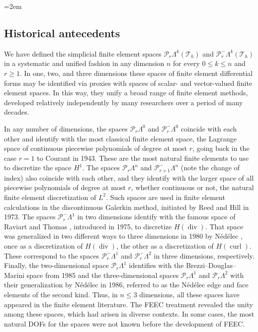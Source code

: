 \endgroup
\begingroup\emergencystretch=2em
\subsection{{Historical antecedents}}\label{sec:historical-antecedents}

{We have defined the simplicial finite element spaces $\mathcal P_r\Lambda^k(\mathcal T_h)$ and $\mathcal P_r^-\Lambda^k(\mathcal T_h)$ in a systematic and unified fashion in any dimension $n$ for every $0\leq k\leq n$ and $r\geq1$. In one, two, and three dimensions these spaces of finite element differential forms may be identified via proxies with spaces of scalar- and vector-valued finite element spaces. In this way, they unify a broad range of finite element methods, developed relatively independently by many researchers over a period of many decades.}

{In any number of dimensions, the spaces $\mathcal P_r\Lambda^0$ and $\mathcal P_r^-\Lambda^0$ coincide with each other and identify with the most classical finite element space, the Lagrange space of continuous piecewise polynomials of degree at most $r$, going back in the case $r=1$ to Courant  in 1943. These are the most natural finite elements to use to discretize the space $H^1$. The spaces $\mathcal P_r\Lambda^n$ and $\mathcal P_{r+1}^-\Lambda^n$ (note the change of index) also coincide with each other, and they identify with the larger space of all piecewise polynomials of degree at most $r$, whether continuous or not, the natural finite element discretization of $L^2$. Such spaces are used in finite element calculations in the discontinuous Galerkin method, initiated by Reed and Hill  in 1973. The spaces $\mathcal P_r^-\Lambda^1$ in two dimensions identify with the famous space of Raviart and Thomas , introduced in 1975, to discretize $H(\operatorname{div})$. That space was generalized in two different ways to three dimensions in 1980 by Nédélec , once as a discretization of $H(\operatorname{div})$, the other as a discretization of $H(\operatorname{curl})$. These correspond to the spaces $\mathcal P_r^-\Lambda^1$ and $\mathcal P_r^-\Lambda^2$ in three dimensions, respectively. Finally, the two-dimensional space $\mathcal P_r\Lambda^1$ identifies with the Brezzi–Douglas–Marini space from 1985 and the three-dimensional spaces $\mathcal P_r\Lambda^1$ and $\mathcal P_r\Lambda^2$ with their generalization by Nédélec in 1986, referred to as the Nédélec edge and face elements of the second kind. Thus, in $n\leq3$ dimensions, all these spaces have appeared in the finite element literature. The FEEC treatment revealed the unity among these spaces, which had arisen in diverse contexts. In some cases, the most natural DOFs for the spaces were not known before the development of FEEC.}

